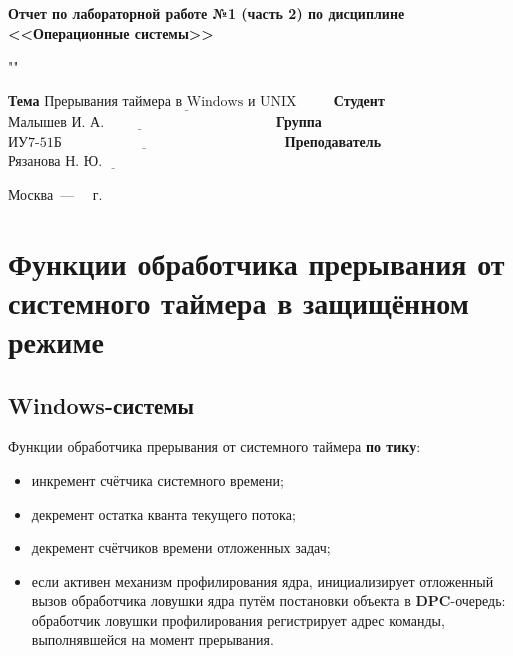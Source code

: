 \documentclass[a4paper,12pt]{extreport}
\begin{document}
\begin{center}
	\Large\textbf{Отчет по лабораторной работе №1 (часть 2) по дисциплине <<Операционные системы>>}
\end{center}

""\newline\newline

\noindent\textbf{Тема} $\underline{\text{Прерывания таймера в Windows и UNIX~~~~~~~}}$\newline\newline
\noindent\textbf{Студент} $\underline{\text{Малышев И. А.~~~~~~~~~~~~~~~~~~~~~~~~~~~~~~~~~~~~}}$\newline\newline
\noindent\textbf{Группа} $\underline{\text{ИУ7-51Б~~~~~~~~~~~~~~~~~~~~~~~~~~~~~~~~~~~~~~~~~~~~~~~}}$\newline\newline
\noindent\textbf{Преподаватель} $\underline{\text{Рязанова Н. Ю.~~~~~~~~~~~~~~~~~~~~~~~~~}}$\newline

\begin{center}
	\vfill
	Москва~---~\the\year
	~г.
\end{center}
\restoregeometry

\newpage

\chapter{Функции обработчика прерывания от системного таймера в защищённом режиме}

\section{Windows-системы}

Функции обработчика прерывания от системного таймера \textbf{по тику}:
\begin{itemize}
	\item инкремент счётчика системного времени;
	\item декремент остатка кванта текущего потока;
	\item декремент счётчиков времени отложенных задач;
	\item если активен механизм профилирования ядра, инициализирует отложенный вызов обработчика ловушки ядра путём постановки объекта в \textbf{DPC}-очередь: обработчик ловушки профилирования регистрирует адрес команды, выполнявшейся на момент прерывания.
\end{itemize}
\end{document}
